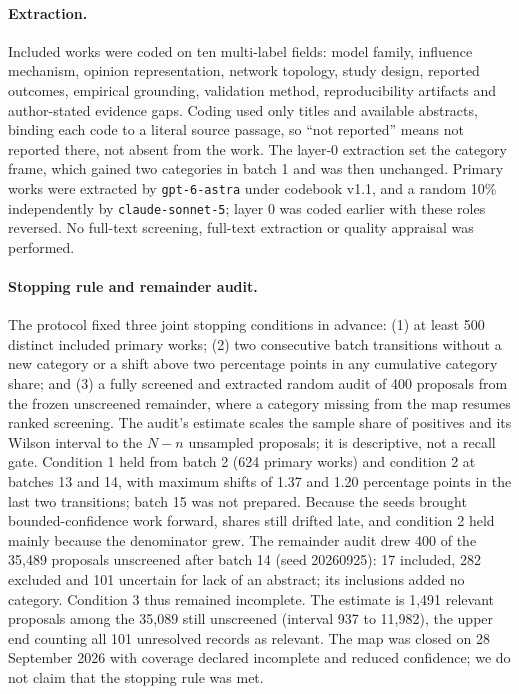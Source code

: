 \paragraph{Extraction.}
Included works were coded on ten multi-label fields: model family, influence mechanism, opinion representation, network topology, study design, reported outcomes, empirical grounding, validation method, reproducibility artifacts and author-stated evidence gaps. %
Coding used only titles and available abstracts, binding each code to a literal source passage, so ``not reported'' means not reported there, not absent from the work. %
The layer-0 extraction set the category frame, which gained two categories in batch 1 and was then unchanged. %
Primary works were extracted by \texttt{gpt-6-astra} under codebook v1.1, and a random 10\% independently by \texttt{claude-sonnet-5}; layer 0 was coded earlier with these roles reversed. %
No full-text screening, full-text extraction or quality appraisal was performed. %

\paragraph{Stopping rule and remainder audit.}
The protocol fixed three joint stopping conditions in advance: (1) at least 500 distinct included primary works; (2) two consecutive batch transitions without a new category or a shift above two percentage points in any cumulative category share; and (3) a fully screened and extracted random audit of 400 proposals from the frozen unscreened remainder, where a category missing from the map resumes ranked screening. %
The audit's estimate scales the sample share of positives and its Wilson interval to the $N-n$ unsampled proposals; it is descriptive, not a recall gate. %
Condition 1 held from batch 2 (624 primary works) and condition 2 at batches 13 and 14, with maximum shifts of 1.37 and 1.20 percentage points in the last two transitions; batch 15 was not prepared. %
Because the seeds brought bounded-confidence work forward, shares still drifted late, and condition 2 held mainly because the denominator grew. %
The remainder audit drew 400 of the 35,489 proposals unscreened after batch 14 (seed 20260925): 17 included, 282 excluded and 101 uncertain for lack of an abstract; its inclusions added no category. %
Condition 3 thus remained incomplete. %
The estimate is 1,491 relevant proposals among the 35,089 still unscreened (interval 937 to 11,982), the upper end counting all 101 unresolved records as relevant. %
The map was closed on 28 September 2026 with coverage declared incomplete and reduced confidence; we do not claim that the stopping rule was met. %

